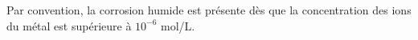 \documentclass[a4paper]{article}
\begin{document}
\pagestyle{fancy}
\fancyhf{}
\setlength{\headheight}{15pt}

\begin{center}
	\large{}
\end{center}


Par convention, la corrosion humide est présente dès que la concentration des ions du métal est supérieure à \(10^{-6}\) mol/L.
\end{document}
